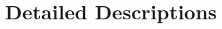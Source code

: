 \chapter{Detailed Descriptions}
\label{chapter:DetailedDescriptions}\label{appendix}
\inputminted{c++}{../../src/main.cu}
